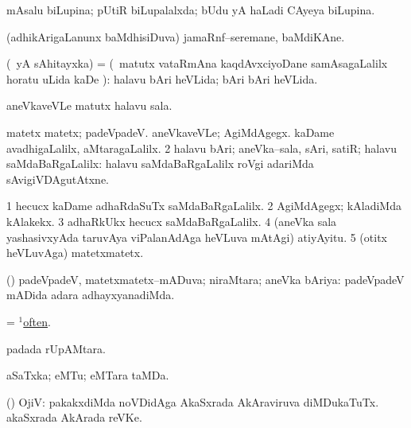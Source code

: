 \bentry
{}
\gl{\gu}
\bmng
mAsalu biLupina; pUtiR biLupalalxda; bUdu yA haLadi CAyeya biLupina. 
\emng
\eentry

\bentry
{}
\gl{\nA}
\bmng
(adhikArigaLanunx baMdhisiDuva) jamaRnf--seremane, baMdiKAne. 
\emng
\eentry

\bentry
{}
\gl{\kirxvi}
\bmng
(\pArxparx\ yA sAhitayxka) =  (\BUkaq\ matutx vataRmAna kaqdAvxciyoDane samAsagaLalilx horatu uLida kaDe \pArxparx):  halavu bAri heVLida; bAri bAri heVLida. 
\emng

\noindent
\gl{\pagu}
\bmng
{} aneVkaveVLe matutx halavu sala. 
\emng
\eentry

\bentry
{}
\gl{\kirxvi}
\bmng
\bnum
{} 
\banum
{} matetx matetx; padeVpadeV. 
 aneVkaveVLe; AgiMdAgegx. 
 kaDame avadhigaLalilx, aMtaragaLalilx. 
\eanum
\numie
\num{2} halavu bAri; aneVka--sala, sAri, satiR; halavu saMdaBaRgaLalilx:  halavu saMdaBaRgaLalilx roVgi adariMda sAvigiVDAgutAtxne. 
\enum
\emng

\noindent
\gl{\pagu}
\bmng
\bnum
\num{1}  hecucx kaDame adhaRdaSuTx saMdaBaRgaLalilx. 
\num{2}  AgiMdAgegx; kAladiMda kAlakekx. 
\num{3}  adhaRkUkx hecucx saMdaBaRgaLalilx. 
\num{4}  (aneVka sala yashasivxyAda taruvAya viPalanAdAga heVLuva mAtAgi) atiyAyitu. 
\num{5}  (otitx heVLuvAga) matetxmatetx. 
\enum
\emng
\eentry

\bentry
{}
\gl{\gu}
\bmng
(\pArxparx) padeVpadeV, matetxmatetx--mADuva; niraMtara; aneVka bAriya:  padeVpadeV mADida adara adhayxyanadiMda. 
\emng
\eentry

\bentry
{}
\gl{\kirxvi}
\bmng
= \hyperlink{often(1)}{$^1$often}. 
\emng
\eentry

\bentry
{}
\gl{\nA}
\bmng
{} padada rUpAMtara. 
\emng
\eentry

\bentry
{}
\gl{\nA}
\bmng
aSaTxka; eMTu; eMTara taMDa. 
\emng
\eentry

\bentry
{}
\gl{\nA}
\bmng
 (\vAshi) OjiV: 
\banum
{} pakakxdiMda noVDidAga  AkaSxrada AkAraviruva diMDukaTuTx. 
  akaSxrada AkArada reVKe. 
\eanum
\emng
\eentry

